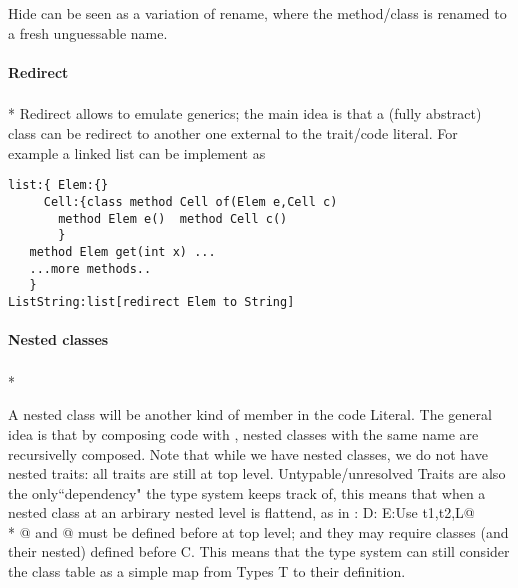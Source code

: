 Hide can be seen as a variation of rename, where the method/class is renamed to a fresh unguessable name.

\paragraph{Redirect}${}_{}$\\*
Redirect allows to emulate generics; the main idea is that a (fully abstract) class can be redirect to another one external to the trait/code literal.
For example a linked list can be implement as
\begin{lstlisting}
list:{ Elem:{}
     Cell:{class method Cell of(Elem e,Cell c) 
       method Elem e()  method Cell c()
       }
   method Elem get(int x) ...
   ...more methods..
   }
ListString:list[redirect Elem to String]
\end{lstlisting}





\paragraph{Nested classes}${}_{}$\\*

A nested class will be another kind of member
in the code Literal.
The general idea is that by composing code with \use, nested classes with the same name are recursivelly composed.
Note that while we have nested classes, we do not have nested traits: all traits are still
at top level.
Untypable/unresolved Traits are also the only``dependency"
the type system keeps track of, this means that when a nested class at an arbirary
nested level is flattend, as in
\Q@C:{ D:{ E:Use t1,t2,L}}@\\*
@ and @ must be defined before \Q@C@ at top level; and they may require classes (and their
nested) defined before C. This means that the type system can still consider
the class table as a simple map from Types T to their definition.

